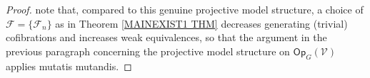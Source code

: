 \documentclass[a4paper,10pt
,draft
]{article}%
\numberwithin{equation}{section}
\numberwithin{figure}{section}
\theoremstyle{definition} %
\newtheorem{definition}[equation]{Definition}%
\newtheorem{remark}[equation]{Remark}%
\newcommand{\F}{\ensuremath{\mathcal F}}
\newcommand{\V}{\ensuremath{\mathcal V}}
\newcommand{\1}{\ensuremath{\mathbbm 1}}%
\begin{document}
\begin{proof}
note that, compared to this genuine projective model structure,
a choice of 
$\mathcal{F} = \{\mathcal{F}_n\}$
as in Theorem \ref{MAINEXIST1 THM}
decreases generating (trivial) cofibrations and
increases weak equivalences,
so that the argument
in the previous paragraph concerning the
projective model structure on
$\mathsf{Op}_{G}(\mathcal{V})$
applies mutatis mutandis.
%
\end{proof}










\end{document}
